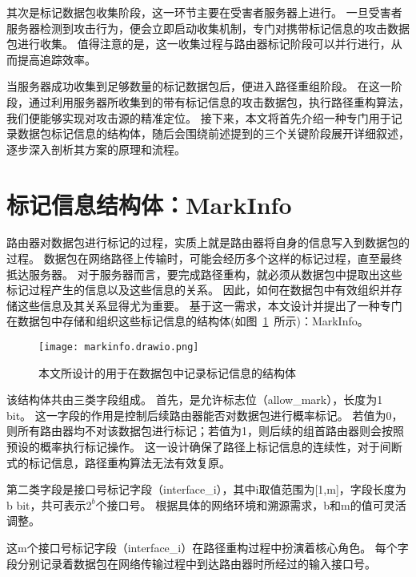 其次是标记数据包收集阶段，这一环节主要在受害者服务器上进行。
一旦受害者服务器检测到攻击行为，便会立即启动收集机制，专门对携带标记信息的攻击数据包进行收集。
值得注意的是，这一收集过程与路由器标记阶段可以并行进行，从而提高追踪效率。

当服务器成功收集到足够数量的标记数据包后，便进入路径重组阶段。
在这一阶段，通过利用服务器所收集到的带有标记信息的攻击数据包，执行路径重构算法，我们便能够实现对攻击源的精准定位。
接下来，本文将首先介绍一种专门用于记录数据包标记信息的结构体，随后会围绕前述提到的三个关键阶段展开详细叙述，逐步深入剖析其方案的原理和流程。
\section{标记信息结构体：MarkInfo}
路由器对数据包进行标记的过程，实质上就是路由器将自身的信息写入到数据包的过程。
数据包在网络路径上传输时，可能会经历多个这样的标记过程，直至最终抵达服务器。
对于服务器而言，要完成路径重构，就必须从数据包中提取出这些标记过程产生的信息以及这些信息的关系。
因此，如何在数据包中有效组织并存储这些信息及其关系显得尤为重要。
基于这一需求，本文设计并提出了一种专门在数据包中存储和组织这些标记信息的结构体(如图~\ref{fig:data_structure}~所示)：MarkInfo。

\begin{figure}[h]
  \centering
  \texttt{[image: markinfo.drawio.png]}
  \caption{本文所设计的用于在数据包中记录标记信息的结构体}
  \label{fig:data_structure}
\end{figure} 

该结构体共由三类字段组成。
首先，是允许标志位（allow\_mark），长度为1 bit。
这一字段的作用是控制后续路由器能否对数据包进行概率标记。
若值为0，则所有路由器均不对该数据包进行标记；若值为1，则后续的组首路由器则会按照预设的概率执行标记操作。
这一设计确保了路径上标记信息的连续性，对于间断式的标记信息，路径重构算法无法有效复原。\par

第二类字段是接口号标记字段（interface\_i），其中i取值范围为[1,m]，字段长度为b bit，共可表示$2^b$个接口号。
根据具体的网络环境和溯源需求，b和m的值可灵活调整。

这m个接口号标记字段（interface\_i）在路径重构过程中扮演着核心角色。
每个字段分别记录着数据包在网络传输过程中到达路由器时所经过的输入接口号。

